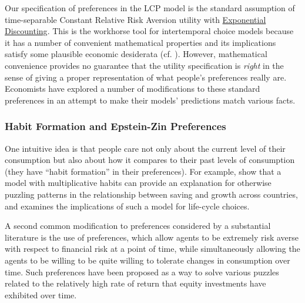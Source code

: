 \documentclass{article}
\begin{document}
Our specification of preferences in the LCP model is the standard assumption of time-separable Constant Relative Risk Aversion utility with \href{https://en.wikipedia.org/wiki/Exponential\_discounting}{Exponential Discounting}.
This is the workhorse tool for intertemporal choice models because it has a number of convenient mathematical properties and its implications satisfy some plausible economic desiderata (cf. \cite{kimballStandardRA}).
However, mathematical convenience provides no guarantee that the utility specification is \textit{right} in the sense of giving a proper representation of what people's preferences really are.
Economists have explored a number of modifications to these standard preferences in an attempt to make their models' predictions match various facts.

\subsubsection{Habit Formation and Epstein-Zin Preferences}

One intuitive idea is that people care not only about the current level of their consumption but also about how it compares to their past levels of consumption (they have ``habit formation'' in their preferences).
For example, \cite{Carroll_2000} show that a model with multiplicative habits can provide an explanation for otherwise puzzling patterns in the relationship between saving and growth across countries, and
\cite{Michaelides_2002} examines the implications of such a model for life-cycle choices.

A second common modification to preferences considered by a substantial literature is the use of \cite{Epstein_1991} preferences, which allow agents to be extremely risk averse with respect to financial risk at a point of time, while simultaneously allowing the agents to be willing to be quite willing to tolerate changes in consumption over time.
Such preferences have been proposed as a way to solve various puzzles related to the relatively high rate of return that equity investments have exhibited over time.
\end{document}
